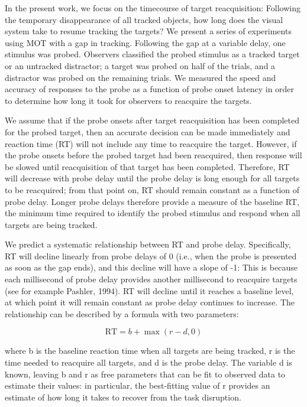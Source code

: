 \documentclass[man,nobf]{apa}
\begin{document}
In the present work, we focus on the timecourse of target reacquisition:
Following the temporary disappearance of all tracked objects, how long does
the visual system take to resume tracking the targets?  We present a series
of experiments using MOT with a gap in tracking.  Following the gap at a
variable delay, one stimulus was probed.  Observers classified the probed
stimulus as a tracked target or an untracked distractor; a target was
probed on half of the trials, and a distractor was probed on the remaining
trials.  We measured the speed and accuracy of responses to the probe as a
function of probe onset latency in order to determine how long it took for
observers to reacquire the targets.

We assume that if the probe onsets after target reacquisition has been
completed for the probed target, then an accurate decision can be made
immediately and reaction time (RT) will not include any time to reacquire
the target.  However, if the probe onsets before the probed target had been
reacquired, then response will be slowed until reacquisition of that target
has been completed.  Therefore, RT will decrease with probe delay until the
probe delay is long enough for all targets to be reacquired; from that
point on, RT should remain constant as a function of probe delay.  Longer
probe delays therefore provide a measure of the baseline RT, the minimum
time required to identify the probed stimulus and respond when all targets
are being tracked.

We predict a systematic relationship between RT and probe delay.
Specifically, RT will decline linearly from probe delays of 0 (i.e., when
the probe is presented as soon as the gap ends), and this decline will have
a slope of -1: This is because each millisecond of probe delay provides
another millisecond to reacquire targets (see for example Pashler, 1994).
RT will decline until it reaches a baseline level, at which point it will
remain constant as probe delay continues to increase.  The relationship can
be described by a formula with two parameters:

\begin{equation}
  \label{eqn:model} \mathrm{RT} = b + \max\left(r - d, 0\right)
\end{equation}

where b is the baseline reaction time when all targets are being tracked, r
is the time needed to reacquire all targets, and d is the probe delay.  The
variable d is known, leaving b and r as free parameters that can be fit to
observed data to estimate their values: in particular, the best-fitting
value of r provides an estimate of how long it takes to recover from the
task disruption.
\end{document}
